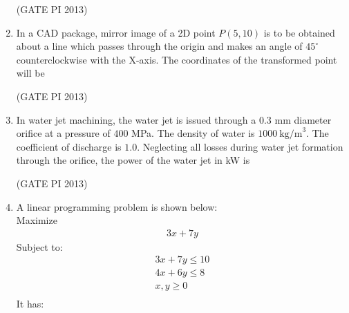 \documentclass[journal,12pt,onecolumn]{IEEEtran}
\theoremstyle{remark}
\begin{document}
\begin{enumerate}
\hfill (GATE PI 2013)


\item In a CAD package, mirror image of a 2D point $P(5,10)$ is to be obtained about a line which passes through the origin and makes an angle of $45^\circ$ counterclockwise with the X-axis. The coordinates of the transformed point will be
\begin{enumerate}
\end{enumerate}

\hfill (GATE PI 2013)

\item In water jet machining, the water jet is issued through a $0.3$ mm diameter orifice at a pressure of $400$ MPa. The density of water is $1000 \ \text{kg/m}^3$. The coefficient of discharge is $1.0$. Neglecting all losses during water jet formation through the orifice, the power of the water jet in kW is
\begin{enumerate}
\end{enumerate}

\hfill (GATE PI 2013)

\item A linear programming problem is shown below: \\ 
Maximize 
\begin{align*}
3x + 7y
\end{align*}
Subject to:  
\begin{align*}
3x + 7y \leq 10 \\
4x + 6y \leq 8  \\
x, y \geq 0 \\
\end{align*}
It has:
\begin{enumerate}
\end{enumerate}


\end{enumerate}
\end{document}
